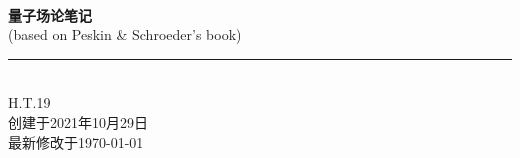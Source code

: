 \documentclass[10pt,b5paper,openany]{book} %
\newcommand{\HRule}{\rule{\linewidth}{0.5mm}}
\begin{document}
\begin{titlepage}
  \centering

  \mbox{} \\[-0.3cm]

  {\bfseries \fontsize{32pt}{1pt} 量子场论笔记} \\[0.2cm]

  (\large based on Peskin \& Schroeder's book) \\[0.8cm]

  \HRule \\[0.8cm]

  {\Large H.T.19} \\[0.3cm]

  {\small 创建于2021年10月29日} \\[-0.1cm]
  
  {\small 最新修改于\today} \\[0.4cm]

\end{titlepage}

\setcounter{page}{1}


\tableofcontents
{}
\clearpage
\end{document}
